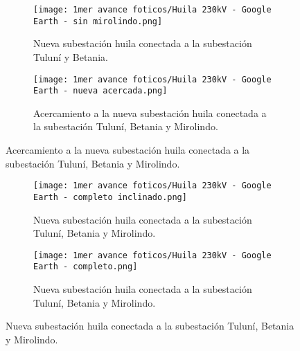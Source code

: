 
\begin{figure}[h!] %
    \hfill %
    \begin{subfigure}{0.5\textwidth}
        \centering %
        \texttt{[image: 1mer avance foticos/Huila 230kV - Google Earth - sin mirolindo.png]}
        \caption{Nueva subestación huila conectada a la subestación Tuluní y Betania.} %
        \label{fig:sin mirolindo} %
    \end{subfigure}
    \begin{subfigure}{0.5\textwidth}
        \centering %
        \texttt{[image: 1mer avance foticos/Huila 230kV - Google Earth - nueva acercada.png]}
        \caption{Acercamiento a la nueva subestación huila conectada a la subestación Tuluní, Betania y Mirolindo.} %
        \label{fig:nueva acercada} %
    \end{subfigure}
\end{figure}


\begin{figure}[h!] %
    \centering %
    \begin{subfigure}{0.5\textwidth}
        \texttt{[image: 1mer avance foticos/Huila 230kV - Google Earth - completo inclinado.png]}
        \caption{Nueva subestación huila conectada a la subestación Tuluní, Betania y Mirolindo.} %
        \label{fig:todo angulo} %
    \end{subfigure}
    \hfill %
    \begin{subfigure}{0.5\textwidth}
        \centering %
        \texttt{[image: 1mer avance foticos/Huila 230kV - Google Earth - completo.png]}
        \caption{Nueva subestación huila conectada a la subestación Tuluní, Betania y Mirolindo.} %
        \label{fig:todo} %
    \end{subfigure}
\end{figure}